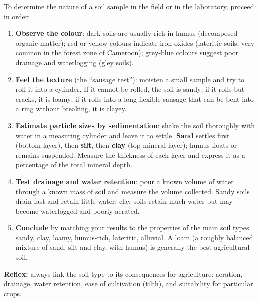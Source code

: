\documentclass[11pt]{article}
\newcommand{\cle}[1]{{\popxbold\color{popdark}#1}}
\begin{document}
\begin{methode}
To determine the nature of a soil sample in the field or in the laboratory, proceed in order:
\begin{enumerate}
\item \textbf{Observe the colour}: dark soils are usually rich in \cle{humus} (decomposed organic matter); red or yellow colours indicate iron oxides (\cle{lateritic soils}, very common in the forest zone of Cameroon); grey-blue colours suggest poor drainage and waterlogging (\cle{gley soils}).
\item \textbf{Feel the texture} (the ``sausage test''): moisten a small sample and try to roll it into a cylinder. If it cannot be rolled, the soil is \cle{sandy}; if it rolls but cracks, it is \cle{loamy}; if it rolls into a long flexible sausage that can be bent into a ring without breaking, it is \cle{clayey}.
\item \textbf{Estimate particle sizes by sedimentation}: shake the soil thoroughly with water in a measuring cylinder and leave it to settle. \textbf{Sand} settles first (bottom layer), then \textbf{silt}, then \textbf{clay} (top mineral layer); humus floats or remains suspended. Measure the thickness of each layer and express it as a percentage of the total mineral depth.
\item \textbf{Test drainage and water retention}: pour a known volume of water through a known mass of soil and measure the volume collected. Sandy soils drain fast and retain little water; clay soils retain much water but may become waterlogged and poorly aerated.
\item \textbf{Conclude} by matching your results to the properties of the main soil types: sandy, clay, loamy, humus-rich, lateritic, alluvial. A \cle{loam} (a roughly balanced mixture of sand, silt and clay, with humus) is generally the best agricultural soil.
\end{enumerate}
\textbf{Reflex:} always link the soil type to its consequences for agriculture: aeration, drainage, water retention, ease of cultivation (tilth), and suitability for particular crops.
\end{methode}
\end{document}
